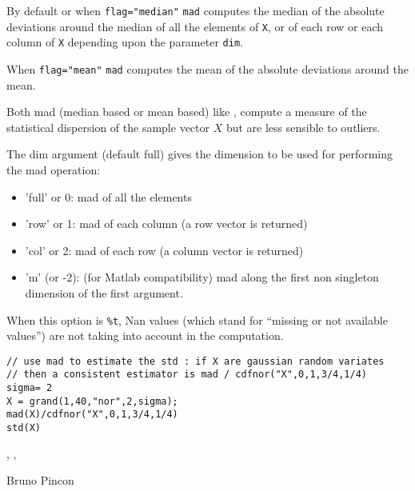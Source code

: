 \begin{mandescription}
 By default or when \verb+flag="median"+ \verb+mad+ computes the median of the absolute deviations
around the median of all the elements of \verb+X+, or of each row or each column of \verb+X+ depending upon
the parameter \verb+dim+.

 When \verb+flag="mean"+  \verb+mad+ computes the mean of the absolute deviations around the
mean.

 Both mad (median based or mean based) like , compute a measure 
of the statistical dispersion of the sample vector $X$ but are less sensible to 
outliers. 


  The dim argument (default full) gives the dimension to be used for performing the mad operation:
  \begin{itemize}
    \item 'full' or 0: mad of all the elements 
    \item 'row' or 1: mad of each column (a row vector is returned)
    \item 'col' or 2: mad of each row (a column vector is returned)
    \item 'm' (or -2): (for Matlab compatibility) mad along the first non 
          singleton dimension of the first argument.
  \end{itemize}

   When this option is \verb+%t+,  Nan values (which stand for ``missing or not 
 available values'') are not taking into account in the computation.
\end{mandescription}
\begin{examples}
\begin{Verbatim}
// use mad to estimate the std : if X are gaussian random variates
// then a consistent estimator is mad / cdfnor("X",0,1,3/4,1/4)
sigma= 2 
X = grand(1,40,"nor",2,sigma);
mad(X)/cdfnor("X",0,1,3/4,1/4)
std(X)
\end{Verbatim}
\end{examples}

\begin{manseealso}
   , , 
\end{manseealso}

\begin{authors}
 Bruno Pincon
\end{authors}
